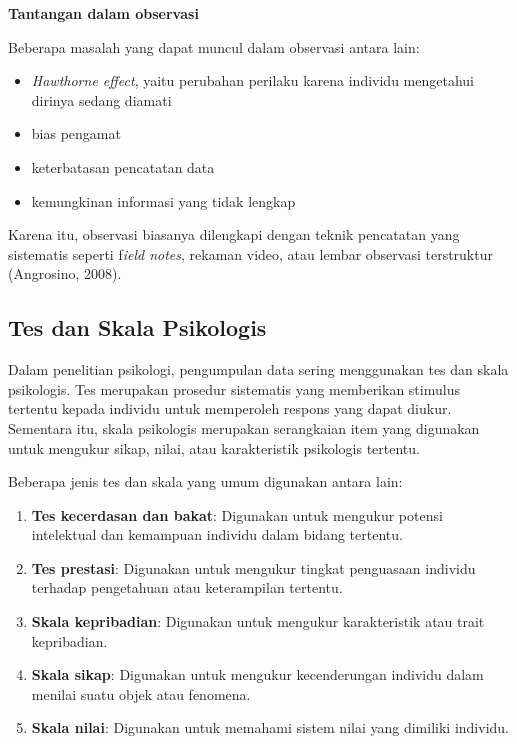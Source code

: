 \documentclass[
  indonesian,
  letterpaper,
  DIV=11,
  numbers=noendperiod]{scrreprt}
\providecommand{\tightlist}{%
  \setlength{\itemsep}{0pt}\setlength{\parskip}{0pt}}
\begin{document}
\textbf{Tantangan dalam observasi}

Beberapa masalah yang dapat muncul dalam observasi antara lain:

\begin{itemize}
\tightlist
\item
  \emph{Hawthorne effect}, yaitu perubahan perilaku karena individu
  mengetahui dirinya sedang diamati
\item
  bias pengamat
\item
  keterbatasan pencatatan data
\item
  kemungkinan informasi yang tidak lengkap
\end{itemize}

Karena itu, observasi biasanya dilengkapi dengan teknik pencatatan yang
sistematis seperti f\emph{ield notes}, rekaman video, atau lembar
observasi terstruktur (Angrosino, 2008).

\subsection{Tes dan Skala Psikologis}\label{tes-dan-skala-psikologis}

Dalam penelitian psikologi, pengumpulan data sering menggunakan tes dan
skala psikologis. Tes merupakan prosedur sistematis yang memberikan
stimulus tertentu kepada individu untuk memperoleh respons yang dapat
diukur. Sementara itu, skala psikologis merupakan serangkaian item yang
digunakan untuk mengukur sikap, nilai, atau karakteristik psikologis
tertentu.

Beberapa jenis tes dan skala yang umum digunakan antara lain:

\begin{enumerate}
\def\labelenumi{\alph{enumi}.}
\tightlist
\item
  \textbf{Tes kecerdasan dan bakat}: Digunakan untuk mengukur potensi
  intelektual dan kemampuan individu dalam bidang tertentu.
\item
  \textbf{Tes prestasi}: Digunakan untuk mengukur tingkat penguasaan
  individu terhadap pengetahuan atau keterampilan tertentu.
\item
  \textbf{Skala kepribadian}: Digunakan untuk mengukur karakteristik
  atau trait kepribadian.
\item
  \textbf{Skala sikap}: Digunakan untuk mengukur kecenderungan individu
  dalam menilai suatu objek atau fenomena.
\item
  \textbf{Skala nilai}: Digunakan untuk memahami sistem nilai yang
  dimiliki individu.
\end{enumerate}
\end{document}
